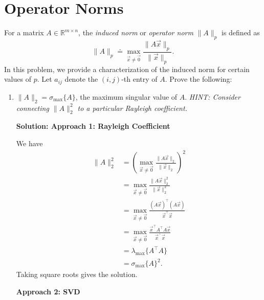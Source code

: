 \documentclass[10pt]{article}
\theoremstyle{definition}
\theoremstyle{plain}
\newcommand{\RR}{\mathbb{R}}
\begin{document}
\newpage

\section{Operator Norms}

For a matrix $A \in \RR^{m \times n}$, the \textit{induced norm} or \textit{operator norm} $\|A\|_p$ is defined as
\begin{equation}
\|A\|_p \doteq \max_{\vec{x} \neq \vec{0}} \frac{\|A\vec{x}\|_p}{\|\vec{x}\|_p}.
\end{equation}
In this problem, we provide a characterization of the induced norm for certain values of $p$. Let $a_{ij}$ denote the $(i,j)$-th entry of $A$. Prove the following:

\begin{enumerate}[label=(\alph*)]
\item $\|A\|_2 = \sigma_{\max}\{A\}$, the maximum singular value of $A$. \textit{HINT: Consider connecting $\|A\|_2^2$ to a particular Rayleigh coefficient.}

\textbf{Solution: Approach 1: Rayleigh Coefficient}

We have
\begin{align}
\|A\|_2^2 &= \left(\max_{\vec{x} \neq \vec{0}} \frac{\|A\vec{x}\|_2}{\|\vec{x}\|_2}\right)^2 \\
&= \max_{\vec{x} \neq \vec{0}} \frac{\|A\vec{x}\|_2^2}{\|\vec{x}\|_2^2} \\
&= \max_{\vec{x} \neq \vec{0}} \frac{(A\vec{x})^\top(A\vec{x})}{\vec{x}^\top \vec{x}} \\
&= \max_{\vec{x} \neq \vec{0}} \frac{\vec{x}^\top A^\top A \vec{x}}{\vec{x}^\top \vec{x}} \\
&= \lambda_{\max}\{A^\top A\} \\
&= \sigma_{\max}\{A\}^2.
\end{align}
Taking square roots gives the solution.

\textbf{Approach 2: SVD}


\end{enumerate}
\end{document}
